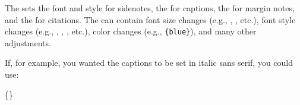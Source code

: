 The  sets the font and style for sidenotes, the
 for captions, the  for
margin notes, and the  for citations.  The
 can contain font size changes (e.g.,
, , etc.), font style changes (e.g.,
, , , etc.), color changes (e.g.,
\texttt{\{blue\}}), and many other adjustments.

If, for example, you wanted the captions to be set in italic sans serif, you could use:
\begin{docspec}
  \{\}
\end{docspec}
